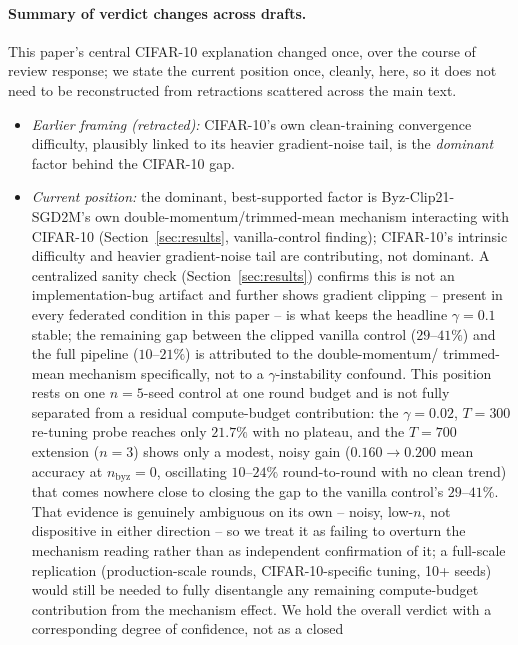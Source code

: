 \documentclass{article}
\begin{document}
\paragraph{Summary of verdict changes across drafts.} This paper's central
CIFAR-10 explanation changed once, over the course of review response; we
state the current position once, cleanly, here, so it does not need to be
reconstructed from retractions scattered across the main text.
\begin{itemize}
\item \emph{Earlier framing (retracted):} CIFAR-10's own clean-training
  convergence difficulty, plausibly linked to its heavier gradient-noise
  tail, is the \emph{dominant} factor behind the CIFAR-10 gap.
\item \emph{Current position:} the dominant, best-supported factor is
  Byz-Clip21-SGD2M's own double-momentum/trimmed-mean mechanism interacting
  with CIFAR-10 (Section~\ref{sec:results}, vanilla-control finding);
  CIFAR-10's intrinsic difficulty and heavier gradient-noise tail are
  contributing, not dominant. A centralized sanity check
  (Section~\ref{sec:results}) confirms this is not an implementation-bug
  artifact and further shows gradient clipping -- present in every federated
  condition in this paper -- is what keeps the headline $\gamma{=}0.1$ stable;
  the remaining gap between the clipped vanilla control ($29$--$41\%$) and the
  full pipeline ($10$--$21\%$) is attributed to the double-momentum/
  trimmed-mean mechanism specifically, not to a $\gamma$-instability
  confound. This position rests on one $n{=}5$-seed control at one round
  budget and is not fully separated from a residual compute-budget
  contribution: the $\gamma{=}0.02$, $T{=}300$ re-tuning probe reaches only
  $21.7\%$ with no plateau, and the $T{=}700$ extension ($n{=}3$) shows only
  a modest, noisy gain ($0.160\to0.200$ mean accuracy at $n_{\text{byz}}{=}0$,
  oscillating $10$--$24\%$ round-to-round with no clean trend) that comes
  nowhere close to closing the gap to the vanilla control's $29$--$41\%$.
  That evidence is genuinely ambiguous on its own -- noisy, low-$n$, not
  dispositive in either direction -- so we treat it as failing to overturn
  the mechanism reading rather than as independent confirmation of it; a
  full-scale replication (production-scale rounds, CIFAR-10-specific tuning,
  10+ seeds) would still be needed to fully disentangle any remaining
  compute-budget contribution from the mechanism effect. We hold the overall
  verdict with a corresponding degree of confidence, not as a closed

\end{itemize}
\end{document}
